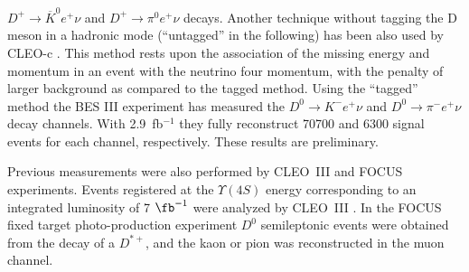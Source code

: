 $D^+\to {\overline K}^{0} e^+\nu$ and $D^+\to \pi^{0} e^+\nu$ decays. 
Another technique without tagging the D meson in a hadronic mode (``untagged'' in the following) has been also 
used by CLEO-c \cite{Dobbs:2007aa}. This method rests upon the association of the missing energy and momentum in 
an event with the neutrino four momentum, with the penalty of larger background as compared to the tagged method. 
Using the ``tagged'' method the BES III experiment has measured the $D^0 \to {K}^- e^+ \nu$ and 
$D^0 \to {\pi}^- e^+ \nu$ decay channels. With 2.9~fb$^{-1}$ they fully reconstruct 70700 and 6300 signal 
events for each channel, respectively. These results are preliminary. 

  Previous measurements were also performed by CLEO~III and FOCUS experiments. 
Events registered at the $\Upsilon (4S)$ energy corresponding to an integrated luminosity of 7 $\fb^{-1}$ were 
analyzed by CLEO~III \cite{Huang:2004fra}. 
In the FOCUS fixed target photo-production experiment $D^0$ semileptonic events were obtained from the decay of 
a $D^{\ast +}$, and the kaon or pion was reconstructed in the muon channel. 

